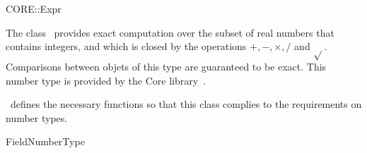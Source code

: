 \ccDefGlobalScope{}
\begin{ccRefClass}{CORE::Expr}

\ccDefinition

The class \ccRefName\ provides exact computation over the subset of real
numbers that contains integers, and which is closed by the operations
$+,-,\times,/$ and $\sqrt{}$.  Comparisons between objets of this type
are guaranteed to be exact.  This number type is provided by the
{\sc Core} library~\cite{klpy-clp-99}.

\cgal\ defines the necessary functions so that this class complies to the
requirements on number types.


\ccIsModel
FieldNumberType

\end{ccRefClass}
